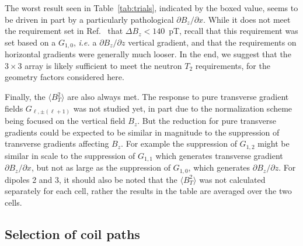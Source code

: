 \documentclass[preprint,12pt]{elsarticle}
\begin{document}
The worst result seen in Table~\ref{tab:trials}, indicated by the
boxed value, seems to be driven in part by a particularly pathological
$\partial B_z/\partial x$.  While it does not meet the requirement set
in Ref.~\cite{bib:jeffnote} that $\Delta B_z<140$~pT, recall that this
requirement was set based on a $G_{1,0}$, {\it i.e.} a $\partial
B_z/\partial z$ vertical gradient, and that the requirements on
horizontal gradients were generally much looser.  In the end, we
suggest that the $3\times 3$ array is likely sufficient to meet the
neutron $T_2$ requirements, for the geometry factors considered here.

Finally, the $\langle B_T^2\rangle$ are also always met.  The response
to pure transverse gradient fields $G_{\ell,\pm(\ell+1)}$ was not
studied yet, in part due to the normalization scheme being focused on
the vertical field $B_z$.  But the reduction for pure transverse
gradients could be expected to be similar in magnitude to the
suppression of transverse gradients affecting $B_z$.  For example the
suppression of $G_{1,2}$ might be similar in scale to the suppression
of $G_{1,1}$ which generates transverse gradient $\partial
B_z/\partial x$, but not as large as the suppression of $G_{1,0}$,
which generates $\partial B_z/\partial z$.  For dipoles 2 and 3, it
should also be noted that the $\langle B_T^2\rangle$ was not
calculated separately for each cell, rather the results in the table
are averaged over the two cells.

\subsection{Selection of coil paths}
\end{document}
